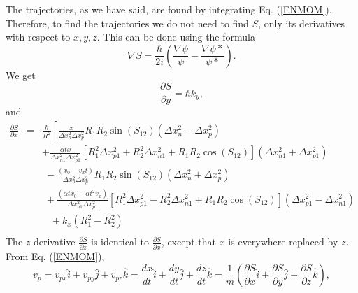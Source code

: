 \documentclass[12pt]{article}       %
\begin{document}
The trajectories, as we have said, are found by integrating Eq. (\ref{ENMOM}). Therefore, to find the trajectories we do not need to find $S$,  only its derivatives with respect to $x,y,z$. This  can be done using  the formula
\begin{equation}
\nabla S=\frac{\hbar}{2i}\left( \frac{\nabla \psi}{\psi}-\frac{\nabla \psi*}{\psi*}    \right).
\end{equation}
We  get
\begin{equation}
\frac{\partial S}{\partial y}=\hbar k_y,
\end {equation}
and
\begin{eqnarray}
\frac{\partial S}{\partial x}&=&\frac{\hbar}{R^2}\left[    \frac{x}{\Delta x_n^2\Delta x_p^2 }R_1 R_2\sin(S_{12}) (\Delta x_n^2-\Delta x_p^2)          \right.                                               \nonumber\\
&&+  \frac{\alpha t x}{\Delta x_{n1}^2\Delta x_{p1}^2}\left[ R_1^2\Delta x_{p1}^2 +   R_2^2\Delta x_{n1}^2 + R_1 R_2\cos(S_{12})   \right](\Delta x_{n1}^2+\Delta x_{p1}^2)                                                \nonumber\\
&&\;-   \frac{(x_0-v_xt)}{\Delta x_n^2\Delta x_p^2 } R_1 R_2\sin(S_{12}) (\Delta x_n^2+\Delta x_p^2)                                                      \nonumber\\
&&\;+ \frac{(\alpha t x_0-\alpha t^2v_x)}{\Delta x_{n1}^2\Delta x_{p1}^2}\left[R_1^2\Delta x_{p1}^2 -  R_2^2\Delta x_{n1}^2 + R_1 R_2\cos(S_{12})   \right](\Delta x_{p1}^2-\Delta x_{n1}^2)                                                         \nonumber\\
&&\;\;\;+ k_x(  R_1^2 -  R_2^2)                                                 \nonumber\\
\end{eqnarray}
The $z$-derivative $\frac{\partial S}{\partial z}$ is identical to $\frac{\partial S}{\partial x}$, except that $x$ is everywhere replaced by $z$. From Eq. (\ref{ENMOM}),
\begin{equation}
v_p=v_{px}\hat{i}+v_{py}\hat{j}+v_{pz}\hat{k}=\frac{dx}{dt}\hat{i}+\frac{dy}{dt}\hat{j}+\frac{dz}{dt}\hat{k}=\frac{1}{m}\left(    \frac{\partial S}{\partial x}\hat{i}+\frac{\partial S}{\partial y}\hat{j}+\frac{\partial S}{\partial z}\hat{k}  \right),
\end{equation}
\end{document}
